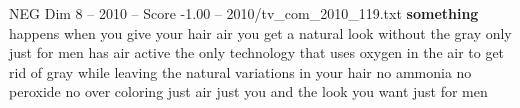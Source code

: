 \begin{textsample}{NEG Dim 8 – 2010 – Score -1.00 – 2010/tv\_com\_2010\_119.txt}  \label{ex:f8_neg_041}
\textbf{something} happens when you give your hair air you get a natural look without the gray only just for men has air active the only technology that uses oxygen in the air to get rid of gray while leaving the natural variations in your hair no ammonia no peroxide no over coloring just air just you and the look you want just for men

\end{textsample}
